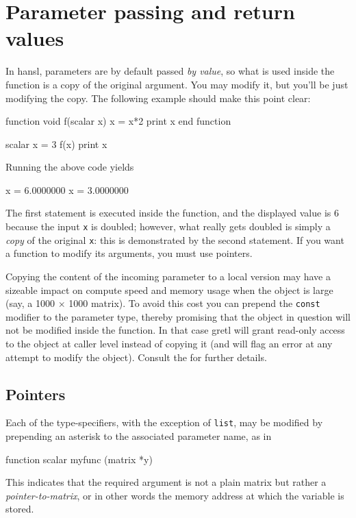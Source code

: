 \section{Parameter passing and return values}
\label{sec:params-returns}

In hansl, parameters are by default passed \emph{by value}, so what is
used inside the function is a copy of the original argument. You may
modify it, but you'll be just modifying the copy. The following
example should make this point clear:
\begin{code}
function void f(scalar x)
    x = x*2
    print x
end function

scalar x = 3
f(x)
print x
\end{code}
Running the above code yields
\begin{code}
              x =  6.0000000
              x =  3.0000000
\end{code}
The first  statement is executed inside the function, and
the displayed value is 6 because the input \verb|x| is doubled;
however, what really gets doubled is simply a \emph{copy} of the
original \texttt{x}: this is demonstrated by the second 
statement.  If you want a function to modify its arguments, you must
use pointers.

Copying the content of the incoming parameter to a local version may
have a sizeable impact on compute speed and memory usage when the
object is large (say, a 1000 $\times$ 1000 matrix). To avoid this cost
you can prepend the \texttt{const} modifier to the parameter type,
thereby promising that the object in question will not be modified
inside the function. In that case gretl will grant read-only access to
the object at caller level instead of copying it (and will flag an
error at any attempt to modify the object). Consult the \GUG{} for
further details.

\subsection{Pointers}

Each of the type-specifiers, with the exception of \texttt{list}, may
be modified by prepending an asterisk to the associated parameter
name, as in
%
\begin{code}
function scalar myfunc (matrix *y)
\end{code}
This indicates that the required argument is not a plain matrix but
rather a \emph{pointer-to-matrix}, or in other words the memory
address at which the variable is stored.

